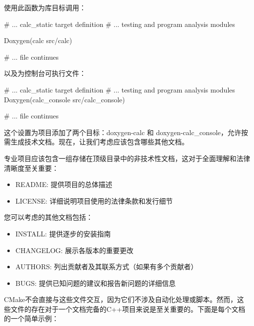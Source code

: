 使用此函数为库目标调用：


\begin{cmake}
# ... calc_static target definition
# ... testing and program analysis modules

Doxygen(calc src/calc)

# ... file continues
\end{cmake}

以及为控制台可执行文件：


\begin{cmake}
# ... calc_static target definition
# ... testing and program analysis modules
Doxygen(calc_console src/calc_console)

# ... file continues
\end{cmake}

这个设置为项目添加了两个目标：doxygen-calc 和 doxygen-calc\_console，允许按需生成技术文档。现在，让我们考虑应该包含哪些其他文档。


专业项目应该包含一组存储在顶级目录中的非技术性文档，这对于全面理解和法律清晰度至关重要：

\begin{itemize}
\item
README: 提供项目的总体描述

\item
LICENSE: 详细说明项目使用的法律条款和发行细节
\end{itemize}

您可以考虑的其他文档包括：

\begin{itemize}
\item
INSTALL: 提供逐步的安装指南

\item
CHANGELOG: 展示各版本的重要更改

\item
AUTHORS: 列出贡献者及其联系方式（如果有多个贡献者）

\item
BUGS: 提供已知问题的建议和报告新问题的详细信息
\end{itemize}

CMake不会直接与这些文件交互，因为它们不涉及自动化处理或脚本。然而，这些文件的存在对于一个文档完备的C++项目来说是至关重要的。下面是每个文档的一个简单示例：

